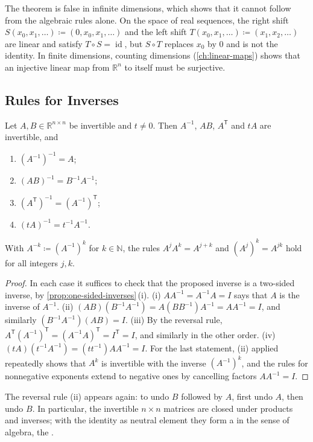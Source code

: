 The theorem is false in infinite dimensions, which shows that it cannot follow from the algebraic rules alone. On the space of real sequences, the right shift $S(x_0,x_1,\ldots)\coloneqq(0,x_0,x_1,\ldots)$ and the left shift $T(x_0,x_1,\ldots)\coloneqq(x_1,x_2,\ldots)$ are linear and satisfy $T\circ S=\operatorname{id}$, but $S\circ T$ replaces $x_0$ by $0$ and is not the identity. In finite dimensions, counting dimensions (\cref{ch:linear-maps}) shows that an injective linear map from $\mathbb R^n$ to itself must be surjective.

\subsection{Rules for Inverses}

\begin{proposition}
\label{prop:inverse-rules}
Let $A,B\in\mathbb R^{n\times n}$ be invertible and $t\ne0$. Then $A^{-1}$, $AB$, $A^{\mathsf T}$ and $tA$ are invertible, and
\begin{enumerate}
\item $(A^{-1})^{-1}=A$;
\item $(AB)^{-1}=B^{-1}A^{-1}$;
\item $(A^{\mathsf T})^{-1}=(A^{-1})^{\mathsf T}$;
\item $(tA)^{-1}=t^{-1}A^{-1}$.
\end{enumerate}
With $A^{-k}\coloneqq(A^{-1})^k$ for $k\in\mathbb N$, the rules $A^jA^k=A^{j+k}$ and $(A^j)^k=A^{jk}$ hold for all integers $j,k$.
\end{proposition}

\begin{proof}
In each case it suffices to check that the proposed inverse is a two-sided inverse, by \cref{prop:one-sided-inverses}\,(i). (i) $AA^{-1}=A^{-1}A=I$ says that $A$ is the inverse of $A^{-1}$. (ii) $(AB)(B^{-1}A^{-1})=A(BB^{-1})A^{-1}=AA^{-1}=I$, and similarly $(B^{-1}A^{-1})(AB)=I$. (iii) By the reversal rule, $A^{\mathsf T}(A^{-1})^{\mathsf T}=(A^{-1}A)^{\mathsf T}=I^{\mathsf T}=I$, and similarly in the other order. (iv) $(tA)(t^{-1}A^{-1})=(tt^{-1})AA^{-1}=I$. For the last statement, (ii) applied repeatedly shows that $A^k$ is invertible with the inverse $(A^{-1})^k$, and the rules for nonnegative exponents extend to negative ones by cancelling factors $AA^{-1}=I$.
\end{proof}

The reversal rule (ii) appears again: to undo $B$ followed by $A$, first undo $A$, then undo $B$. In particular, the invertible $n\times n$ matrices are closed under products and inverses; with the identity as neutral element they form a  in the sense of algebra, the .

